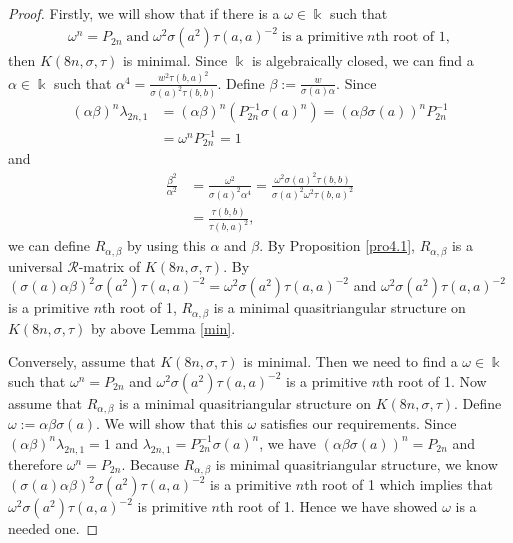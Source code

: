 \documentclass[a4paper,11pt]{amsart}
\numberwithin{equation}{section}
\begin{document}
\begin{proof}
Firstly, we will show that if there is a $\omega \in \Bbbk$ such that
\begin{align*}
\omega^n=P_{2n}\; \text{and}\; \omega^2 \sigma(a^2)\tau(a,a)^{-2} \;\text{is a primitive} \;n\text{th root of 1},
\end{align*}
then $K(8n,\sigma,\tau)$ is minimal. Since $\Bbbk$ is algebraically closed, we can find a $\alpha\in \Bbbk$ such that $\alpha^4=\frac{w^2 \tau(b,a)^2}{\sigma(a)^2 \tau(b,b)}$. Define $\beta:=\frac{w}{\sigma(a)\alpha}$. Since
\begin{align*}
(\alpha\beta)^n \lambda_{2n,1}&=(\alpha\beta)^n (P_{2n}^{-1} \sigma(a)^n)=(\alpha \beta  \sigma(a))^n P_{2n}^{-1}\\
&=\omega^n P_{2n}^{-1}=1
\end{align*}
and
\begin{align*}
\frac{\beta^2}{\alpha^2}&=\frac{\omega^2}{\sigma(a)^2 \alpha^4} =\frac{\omega^2 \sigma(a)^2 \tau(b,b)}{\sigma(a)^2 \omega^2 \tau(b,a)^2}\\
&=\frac{\tau(b,b)}{\tau(b,a)^2},
\end{align*}
 we can define $R_{\alpha,\beta}$ by using this $\alpha$ and $\beta$. By Proposition \ref{pro4.1}, $R_{\alpha,\beta}$ is a universal $\mathcal{R}$-matrix of $K(8n,\sigma,\tau)$. By $(\sigma(a) \alpha \beta)^2\sigma(a^2) \tau(a,a)^{-2}=\omega^2 \sigma(a^2)\tau(a,a)^{-2}$ and $\omega^2 \sigma(a^2)\tau(a,a)^{-2}$ is a primitive $n$th root of 1,  $R_{\alpha,\beta}$ is a minimal quasitriangular structure on $K(8n,\sigma,\tau)$ by above Lemma \ref{min}.

Conversely, assume that $K(8n,\sigma,\tau)$ is minimal. Then we need to find a $\omega \in \Bbbk$ such that $\omega^n=P_{2n}$ and $\omega^2 \sigma(a^2)\tau(a,a)^{-2}$ is a primitive $n$th root of 1. Now assume that $R_{\alpha,\beta}$ is a minimal quasitriangular structure on $K(8n,\sigma,\tau)$. Define $\omega:=\alpha \beta \sigma(a)$. We will show that this $\omega$ satisfies our requirements.  Since $(\alpha \beta)^n \lambda_{2n,1}=1$ and $\lambda_{2n,1}=P_{2n}^{-1} \sigma(a)^n$, we have $(\alpha \beta \sigma(a))^n=P_{2n}$ and therefore $\omega^n=P_{2n}$. Because $R_{\alpha,\beta}$ is minimal quasitriangular structure, we know $(\sigma(a) \alpha \beta)^2 \sigma(a^2) \tau(a,a)^{-2}$ is a primitive $n$th root of 1 which implies that $\omega^2 \sigma(a^2) \tau(a,a)^{-2}$ is primitive $n$th root of 1. Hence we have showed $\omega$ is a needed one.


\end{proof}
\end{document}
